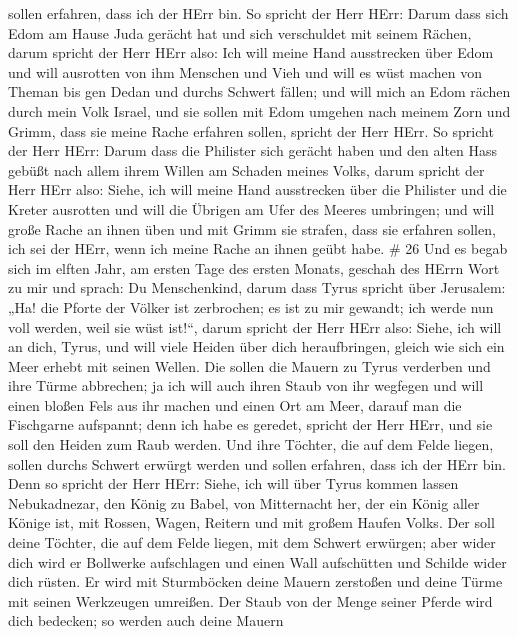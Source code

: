 sollen erfahren, dass ich der HErr bin.  So spricht der
Herr HErr: Darum dass sich Edom am Hause Juda gerächt hat und sich
verschuldet mit seinem Rächen,  darum spricht der Herr HErr
also: Ich will meine Hand ausstrecken über Edom und will ausrotten von
ihm Menschen und Vieh und will es wüst machen von Theman bis gen Dedan
und durchs Schwert fällen;  und will mich an Edom rächen
durch mein Volk Israel, und sie sollen mit Edom umgehen nach meinem Zorn
und Grimm, dass sie meine Rache erfahren sollen, spricht der Herr HErr.
 So spricht der Herr HErr: Darum dass die Philister sich
gerächt haben und den alten Hass gebüßt nach allem ihrem Willen am
Schaden meines Volks,  darum spricht der Herr HErr also:
Siehe, ich will meine Hand ausstrecken über die Philister und die Kreter
ausrotten und will die Übrigen am Ufer des Meeres umbringen;
 und will große Rache an ihnen üben und mit Grimm sie
strafen, dass sie erfahren sollen, ich sei der HErr, wenn ich meine
Rache an ihnen geübt habe. \# 26  Und es begab sich im
elften Jahr, am ersten Tage des ersten Monats, geschah des HErrn Wort zu
mir und sprach:  Du Menschenkind, darum dass Tyrus spricht
über Jerusalem: „Ha! die Pforte der Völker ist zerbrochen; es ist zu mir
gewandt; ich werde nun voll werden, weil sie wüst ist!{}``, 
darum spricht der Herr HErr also: Siehe, ich will an dich, Tyrus, und
will viele Heiden über dich heraufbringen, gleich wie sich ein Meer
erhebt mit seinen Wellen.  Die sollen die Mauern zu Tyrus
verderben und ihre Türme abbrechen; ja ich will auch ihren Staub von ihr
wegfegen und will einen bloßen Fels aus ihr machen  und
einen Ort am Meer, darauf man die Fischgarne aufspannt; denn ich habe es
geredet, spricht der Herr HErr, und sie soll den Heiden zum Raub werden.
 Und ihre Töchter, die auf dem Felde liegen, sollen durchs
Schwert erwürgt werden und sollen erfahren, dass ich der HErr bin.
 Denn so spricht der Herr HErr: Siehe, ich will über Tyrus
kommen lassen Nebukadnezar, den König zu Babel, von Mitternacht her, der
ein König aller Könige ist, mit Rossen, Wagen, Reitern und mit großem
Haufen Volks.  Der soll deine Töchter, die auf dem Felde
liegen, mit dem Schwert erwürgen; aber wider dich wird er Bollwerke
aufschlagen und einen Wall aufschütten und Schilde wider dich rüsten.
 Er wird mit Sturmböcken deine Mauern zerstoßen und deine
Türme mit seinen Werkzeugen umreißen.  Der Staub von der
Menge seiner Pferde wird dich bedecken; so werden auch deine Mauern
